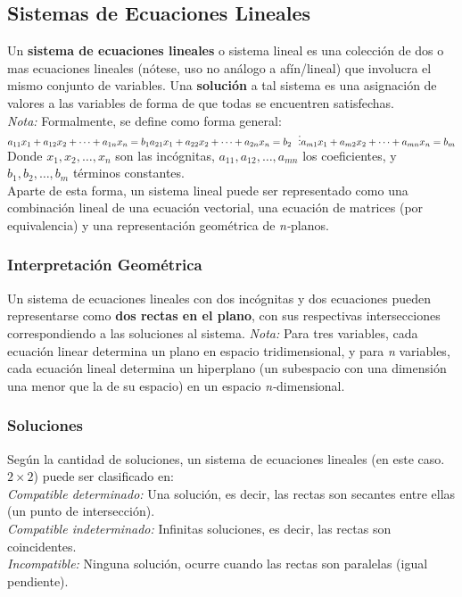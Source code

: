 \subsection{Sistemas de Ecuaciones Lineales}
Un \textbf{sistema de ecuaciones lineales} o sistema lineal es una colección de dos o mas ecuaciones lineales (nótese, uso no análogo a afín/lineal) que involucra el mismo conjunto de variables. Una \textbf{solución} a tal sistema es una asignación de valores a las variables de forma de que todas se encuentren satisfechas.\\

\textit{Nota:} Formalmente, se define como forma general:\\
$a_{11} x_1 + a_{12} x_2  + \cdots + a_{1n} x_n  = b_1 \\
    a_{21} x_1 + a_{22} x_2  + \cdots + a_{2n} x_n  = b_2 \\
    \ \ \vdots\\
    a_{m1} x_1 + a_{m2} x_2  + \cdots + a_{mn} x_n  = b_ m$\\
    Donde $x_1, x_2,\ldots,x_n$ son las incógnitas, $a_{11},a_{12},\ldots,a_{mn}$ los coeficientes, y $b_1,b_2,\ldots,b_m$ términos constantes.\\

    Aparte de esta forma, un sistema lineal puede ser representado como una combinación lineal de una ecuación vectorial, una ecuación de matrices (por equivalencia) y una representación geométrica de \textit{n-}planos.
\subsubsection{Interpretación Geométrica}
Un sistema de ecuaciones lineales con dos incógnitas y dos ecuaciones pueden representarse como \textbf{dos rectas en el plano}, con sus respectivas intersecciones correspondiendo a las soluciones al sistema.
\textit{Nota:} Para tres variables, cada ecuación linear determina un plano en espacio tridimensional, y para \textit{n} variables, cada ecuación lineal determina un hiperplano (un subespacio con una dimensión una menor que la de su espacio) en un espacio \textit{n-}dimensional.
\subsubsection{Soluciones}
Según la cantidad de soluciones, un sistema de ecuaciones lineales (en este caso. $2\times2$) puede ser clasificado en:\\
\textit{Compatible determinado:} Una solución, es decir, las rectas son secantes entre ellas (un punto de intersección).\\
\textit{Compatible indeterminado:} Infinitas soluciones, es decir, las rectas son coincidentes.\\
\textit{Incompatible:} Ninguna solución, ocurre cuando las rectas son paralelas (igual pendiente).\\